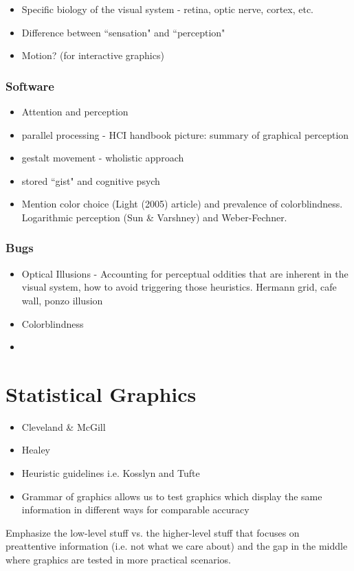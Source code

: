 \documentclass[11pt]{isuthesis}
\begin{document}
\begin{itemize}
\item Specific biology of the visual system - retina, optic nerve, cortex, etc. 

\item Difference between ``sensation" and ``perception"

\item Motion? (for interactive graphics)
\end{itemize}

\subsubsection{Software}
\begin{itemize}
\item Attention and perception

\item parallel processing - HCI handbook picture: summary of graphical perception

\item gestalt movement - wholistic approach

\item stored ``gist" and cognitive psych

\item Mention color choice (Light (2005) article) and prevalence of colorblindness. Logarithmic perception (Sun \& Varshney) and Weber-Fechner. 
\end{itemize}

\subsubsection{Bugs}
\begin{itemize}
\item Optical Illusions - Accounting for perceptual oddities that are inherent in the visual system, how to avoid triggering those heuristics. Hermann grid, cafe wall, ponzo illusion
\item Colorblindness
\item 
\end{itemize}


\section{Statistical Graphics}
\begin{itemize}
\item Cleveland \& McGill
\item Healey
\item Heuristic guidelines i.e. Kosslyn and Tufte
\item Grammar of graphics allows us to test graphics which display the same information in different ways for comparable accuracy
\end{itemize}
Emphasize the low-level stuff vs. the higher-level stuff that focuses on preattentive information (i.e. not what we care about) and the gap in the middle where graphics are tested in more practical scenarios.
\end{document}
